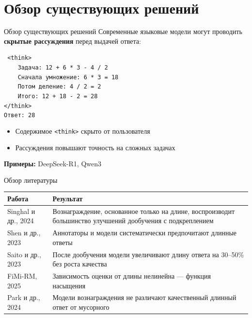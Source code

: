 \section{Обзор существующих решений}
\begin{frame}{Обзор существующих решений}
    Современные языковые модели могут проводить 
    \textbf{скрытые рассуждения} перед выдачей ответа:
    
    \vspace{0.3cm}
    \texttt{%
    <think>\\
    ~~~~Задача: 12 + 6 * 3 - 4 / 2\\
    ~~~~Сначала умножение: 6 * 3 = 18\\
    ~~~~Потом деление: 4 / 2 = 2\\
    ~~~~Итого: 12 + 18 - 2 = 28\\
    </think>\\
    Ответ: 28}
    
    \vspace{0.3cm}
    \begin{itemize}
        \item Содержимое \texttt{<think>} скрыто от пользователя
        \item Рассуждения повышают точность на сложных задачах
    \end{itemize}
    
    \vspace{0.3cm}
    \textbf{Примеры:} DeepSeek-R1, Qwen3
\end{frame}

\begin{frame}{Обзор литературы}
    \begin{table}[h]
    \centering
    \footnotesize
    \begin{tabular}{p{3.2cm}p{7cm}}
        \hline
        \textbf{Работа} & \textbf{Результат} \\
        \hline
        Singhal и др., 2024 & Вознаграждение, основанное только на длине, воспроизводит большинство улучшений дообучения с подкреплением \\
        Shen и др., 2023 & Аннотаторы и модели систематически предпочитают длинные ответы \\
        Saito и др., 2023 & После дообучения модели увеличивают длину ответа на 30--50\% без роста качества \\
        FiMi-RM, 2025 & Зависимость оценки от длины нелинейна --- функция насыщения \\
        Park и др., 2024 & Модели вознаграждения не различают качественный длинный ответ от мусорного \\
        \hline
    \end{tabular}
    \end{table}
\end{frame}

